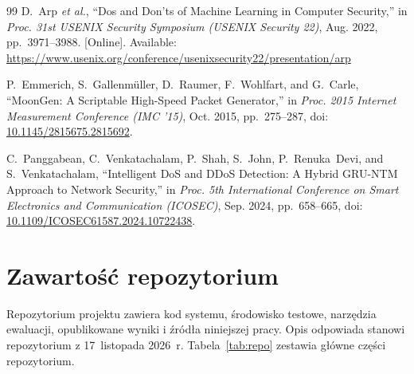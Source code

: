 \documentclass[a4paper,12pt]{article}
\makeatletter
\newcommand*{\zaltocstart}{\let\zal@l@section\l@section
  \renewcommand*{\l@section}[2]{\begingroup\renewcommand*{\numberline}[1]{Załącznik~####1.\enspace}\zal@l@section{##1}{##2}\endgroup}}
\makeatother
\begin{document}
\begin{thebibliography}{99}
D.~Arp \textit{et al.}, ``Dos and Don'ts of Machine Learning in Computer Security,'' in \textit{Proc. 31st USENIX Security Symposium (USENIX Security 22)}, Aug. 2022, pp.~3971--3988. [Online]. Available: \url{https://www.usenix.org/conference/usenixsecurity22/presentation/arp}

P.~Emmerich, S.~Gallenmüller, D.~Raumer, F.~Wohlfart, and G.~Carle, ``MoonGen: A Scriptable High-Speed Packet Generator,'' in \textit{Proc. 2015 Internet Measurement Conference (IMC '15)}, Oct. 2015, pp.~275--287, doi: \href{https://doi.org/10.1145/2815675.2815692}{10.1145/2815675.2815692}.

C.~Panggabean, C.~Venkatachalam, P.~Shah, S.~John, P.~Renuka~Devi, and S.~Venkatachalam, ``Intelligent DoS and DDoS Detection: A Hybrid GRU-NTM Approach to Network Security,'' in \textit{Proc. 5th International Conference on Smart Electronics and Communication (ICOSEC)}, Sep. 2024, pp.~658--665, doi: \href{https://doi.org/10.1109/ICOSEC61587.2024.10722438}{10.1109/ICOSEC61587.2024.10722438}.

\end{thebibliography}

\clearpage
\appendix
\makeatletter
\newcommand*{\zal@prefix@section}{Załącznik~}
\renewcommand*{\@seccntformat}[1]{\csname zal@prefix@#1\endcsname\csname the#1\endcsname\quad}
\makeatother
\addtocontents{toc}{\protect\zaltocstart}

\section{Zawartość repozytorium}\label{sec:zal_repo}
Repozytorium projektu zawiera kod systemu, środowisko testowe, narzędzia ewaluacji, opublikowane wyniki i źródła niniejszej pracy. Opis odpowiada stanowi repozytorium z 17~listopada 2026~r. Tabela~\ref{tab:repo} zestawia główne części repozytorium.
\end{document}
